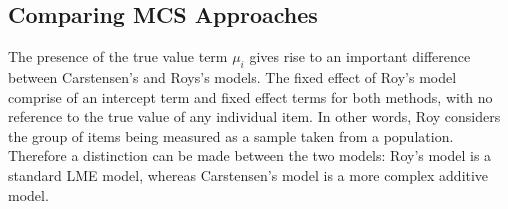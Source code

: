 \documentclass[12pt, a4paper]{report}
\theoremstyle{plain}
\theoremstyle{definition}
\theoremstyle{remark}
\begin{document}
	\subsection{Comparing MCS Approaches}	
%	
%	
	
%	
	
	
	
	The presence of the true value term $\mu_i$ gives rise to an important difference between Carstensen's and Roys's models. The fixed effect of Roy's model comprise of an intercept term and fixed effect terms for both methods, with no reference to the true value of any individual item. In other words, Roy considers the group of items being measured as a sample taken from a population. Therefore a distinction can be made between the two models: Roy's model is a standard LME model, whereas Carstensen's model is a more complex additive model.
	
	
\end{document}
